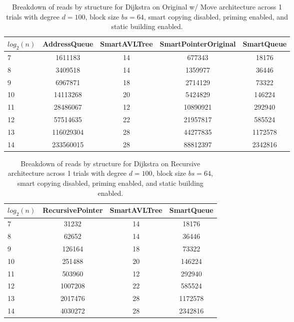 \begin{table}[]
\centering
\begin{tabular}{|l|c|c|c|c|}
$log_2(n)$ & AddressQueue & SmartAVLTree & SmartPointerOriginal & SmartQueue \\ \hline
7 & 1611183 & 14 & 677343 & 18176 \\ \hline
8 & 3409518 & 14 & 1359977 & 36446 \\ \hline
9 & 6967871 & 18 & 2714129 & 73322 \\ \hline
10 & 14113268 & 20 & 5424829 & 146224 \\ \hline
11 & 28486067 & 12 & 10890921 & 292940 \\ \hline
12 & 57514635 & 22 & 21957817 & 585524 \\ \hline
13 & 116029304 & 28 & 44277835 & 1172578 \\ \hline
14 & 233560015 & 28 & 88812397 & 2342816 \\ \hline
\end{tabular}
\caption{Breakdown of reads by structure for Dijkstra on Original w/ Move architecture across 1 trials with degree $d=100$, block size $bs=64$, smart copying disabled, priming enabled, and static building enabled.}
    \label{tab:reads_by_structure_dijkstra_d100_bs64_trials1_copiesfalse_primetrue_staticinsertiontrue_ptoriginal_movetrue}
\end{table}

\begin{table}[]
\centering
\begin{tabular}{|l|c|c|c|}
$log_2(n)$ & RecursivePointer & SmartAVLTree & SmartQueue \\ \hline
7 & 31232 & 14 & 18176 \\ \hline
8 & 62652 & 14 & 36446 \\ \hline
9 & 126164 & 18 & 73322 \\ \hline
10 & 251488 & 20 & 146224 \\ \hline
11 & 503960 & 12 & 292940 \\ \hline
12 & 1007208 & 22 & 585524 \\ \hline
13 & 2017476 & 28 & 1172578 \\ \hline
14 & 4030272 & 28 & 2342816 \\ \hline
\end{tabular}
\caption{Breakdown of reads by structure for Dijkstra on Recursive architecture across 1 trials with degree $d=100$, block size $bs=64$, smart copying disabled, priming enabled, and static building enabled.}
    \label{tab:reads_by_structure_dijkstra_d100_bs64_trials1_copiesfalse_primetrue_staticinsertiontrue_ptrecursive_movetrue}
\end{table}

